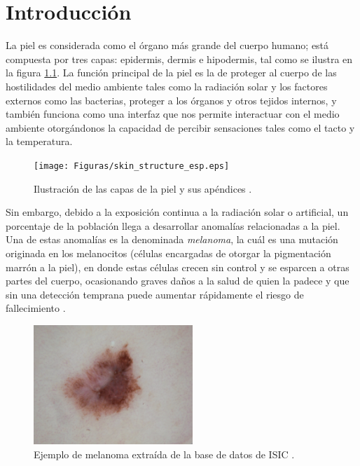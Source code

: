 
\chapter{Introducción}

La piel es considerada como el órgano más grande del cuerpo humano; está compuesta por tres capas: epidermis, dermis e hipodermis, tal como se ilustra en la figura \ref{fig:skin1_jpg}. La función principal de la piel es la de proteger al cuerpo de las hostilidades del medio ambiente tales como la radiación solar y los factores externos como las bacterias, proteger a los órganos y otros tejidos internos, y también funciona como una interfaz que nos permite interactuar con el medio ambiente otorgándonos la capacidad de percibir sensaciones tales como el tacto y la temperatura.

\begin{figure}[h!]
    \texttt{[image: Figuras/skin\_structure\_esp.eps]}
    \centering
    \caption{Ilustración de las capas de la piel y sus apéndices \citep{skin_1}.}
    \label{fig:skin1_jpg}
\end{figure}

Sin embargo, debido a la exposición continua a la radiación solar o artificial, un porcentaje de la población llega a desarrollar anomalías relacionadas a la piel. Una de estas anomalías es la denominada \emph{melanoma}, la cuál es una mutación originada en los melanocitos (células encargadas de otorgar la pigmentación marrón a la piel), en donde estas células crecen sin control y se esparcen a otras partes del cuerpo, ocasionando graves daños a la salud de quien la padece y que sin una detección temprana puede aumentar rápidamente el riesgo de fallecimiento \citep{cancer_org}.

\begin{figure}[h!]
    \includegraphics[width=60mm]{Figuras/ISIC_0012591.jpg}
    \centering
    \caption{Ejemplo de melanoma extraída de la base de datos de ISIC \citep{isic_skin}.}
    \label{fig:can_jpg}
\end{figure}

